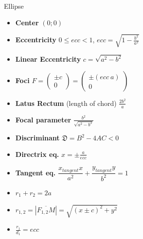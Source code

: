 \documentclass[aspectratio=169]{beamer}
\begin{document}
\begin{frame}[t]{Ellipse}
\begin{multicols}{3}
\begin{itemize}
            \item \textbf{Center} $(0;0)$
            \item \textbf{Eccentricity} $0 \leq ecc < 1$, $ecc = \sqrt{1 - \frac{b^2}{a^2}}$
            \item \textbf{Linear Eccentricity} $c = \sqrt{a^2-b^2}$
            \item \textbf{Foci} $F = \begin{pmatrix} \pm c\\ 0 \end{pmatrix} = \begin{pmatrix} \pm(ecc\ a)\\ 0 \end{pmatrix}$
            \item \textbf{Latus Rectum} (length of chord) $\frac{2b^2}{a}$
            \item \textbf{Focal parameter}  $\frac{b^2}{\sqrt{a^2-b^2}}$
            \item \textbf{Discriminant} $\mathfrak{D} = B^2 - 4AC < 0$
            \item \textbf{Directrix eq.} $x = \pm \frac{a}{ecc}$
            \item \textbf{Tangent eq.} $\dfrac{x_{tangent} x}{a^2}+\dfrac{y_{tangent} y}{b^2}=1$
            \item $r_1 + r_2 = 2a$
            \item $r_{1,2} = |\overline{F_{1,2}M}|=\sqrt{(x \pm c)^2+y^2}$
            \item $\frac{r_1}{d_1}=ecc$
            \end{itemize}
    \end{multicols}
    \end{frame}
\end{document}

